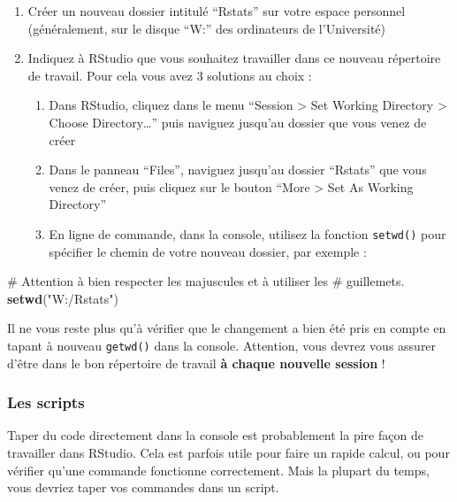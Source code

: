 \documentclass[a4paperpaper,]{article}
\newenvironment{Shaded}{\begin{snugshade}}{\end{snugshade}}
\newcommand{\CommentTok}[1]{\textcolor[rgb]{0.54,0.53,0.53}{#1}}
\newcommand{\KeywordTok}[1]{\textcolor[rgb]{0.12,0.11,0.11}{\textbf{#1}}}
\newcommand{\NormalTok}[1]{\textcolor[rgb]{0.12,0.11,0.11}{#1}}
\newcommand{\StringTok}[1]{\textcolor[rgb]{0.75,0.01,0.01}{#1}}
\providecommand{\tightlist}{%
  \setlength{\itemsep}{0pt}\setlength{\parskip}{0pt}}
\begin{document}
\begin{enumerate}
\def\labelenumi{\arabic{enumi}.}
\tightlist
\item
  Créer un nouveau dossier intitulé ``Rstats'' sur votre espace personnel (généralement, sur le disque ``W:'' des ordinateurs de l'Université)
\item
  Indiquez à RStudio que vous souhaitez travailler dans ce nouveau répertoire de travail. Pour cela vous avez 3 solutions au choix :

  \begin{enumerate}
  \def\labelenumii{\arabic{enumii}.}
  \tightlist
  \item
    Dans RStudio, cliquez dans le menu ``Session \textgreater{} Set Working Directory \textgreater{} Choose Directory\ldots{}'' puis naviguez jusqu'au dossier que vous venez de créer
  \item
    Dans le panneau ``Files'', naviguez jusqu'au dossier ``Rstats'' que vous venez de créer, puis cliquez sur le bouton ``More \textgreater{} Set As Working Directory''
  \item
    En ligne de commande, dans la console, utilisez la fonction \texttt{setwd()} pour spécifier le chemin de votre nouveau dossier, par exemple :
  \end{enumerate}
\end{enumerate}

\begin{Shaded}
\begin{Highlighting}[]
\CommentTok{# Attention à bien respecter les majuscules et à utiliser les}
\CommentTok{# guillemets.}
\KeywordTok{setwd}\NormalTok{(}\StringTok{"W:/Rstats"}\NormalTok{)}
\end{Highlighting}
\end{Shaded}

Il ne vous reste plus qu'à vérifier que le changement a bien été pris en compte en tapant à nouveau \texttt{getwd()} dans la console. Attention, vous devrez vous assurer d'être dans le bon répertoire de travail \textbf{à chaque nouvelle session} !

\hypertarget{les-scripts}{%
\subsubsection{Les scripts}\label{les-scripts}}

Taper du code directement dans la console est probablement la pire façon de travailler dans RStudio. Cela est parfois utile pour faire un rapide calcul, ou pour vérifier qu'une commande fonctionne correctement. Mais la plupart du temps, vous devriez taper vos commandes dans un script.
\end{document}
